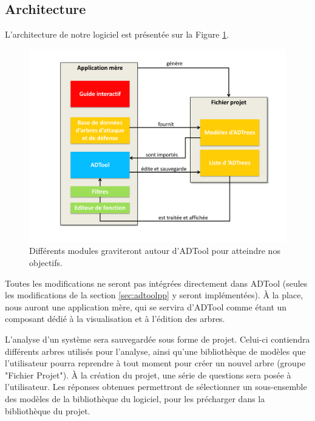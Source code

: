     \subsection{Architecture}
        \label{sec:archi}

        L'architecture de notre logiciel est présentée sur la Figure \ref{fig:archi}.   

        \begin{figure}
            \begin{center}
                \includegraphics[width=1\textwidth]{figure/archi.pdf}
            \end{center}
            \caption{Différents modules graviteront autour d'ADTool pour atteindre nos objectifs.}
            \label{fig:archi}
        \end{figure}

        Toutes les modifications ne seront pas intégrées directement dans ADTool (seules les modifications de la section \ref{sec:adtoolpp} y seront implémentées). \`A la place, nous auront une application mère, qui se servira d'ADTool comme étant un composant dédié à la visualisation et à l'édition des arbres. 

        L'analyse d'un système sera sauvegardée sous forme de projet. Celui-ci contiendra différents arbres utilisés pour l'analyse, ainsi qu'une bibliothèque de modèles que l'utilisateur pourra reprendre à tout moment pour créer un nouvel arbre (groupe "Fichier Projet"). 
        \`A la création du projet, une série de questions sera posée à l'utilisateur. Les réponses obtenues permettront de sélectionner un sous-ensemble des modèles de la bibliothèque du logiciel, pour les précharger dans la bibliothèque du projet.

